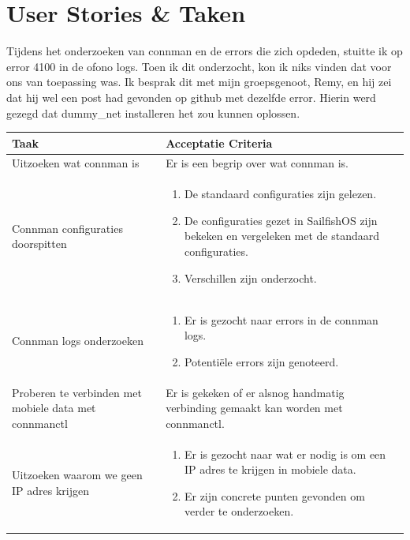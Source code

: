 \documentclass[a4paper]{report}
\newcommand{\learningstorycolor}{PaleGreen1}
\begin{document}
\section{User Stories \& Taken}
\begin{tcolorbox}[colback=white, coltitle=black, colframe=\learningstorycolor, title=\textbf{Learning Story: }Als ontwikkelaar wil ik weten wat de rol van connman is in 4G\, zodat ik kan uitzoeken of het mobiele data probleem ligt bij connman.]
  \par\smallskip 
  Tijdens het onderzoeken van connman en de errors die zich opdeden, stuitte ik op error 4100 in de ofono logs.
  Toen ik dit onderzocht, kon ik niks vinden dat voor ons van toepassing was.
  Ik besprak dit met mijn groepsgenoot, Remy, en hij zei dat hij wel een post had gevonden op github met dezelfde error.
  Hierin werd gezegd dat dummy\_net installeren het zou kunnen oplossen.

  \begin{table}[H]
      \centering
    \begin{tabularx}{1\textwidth}{|X|X|}
      \hline
      \cellcolor[HTML]{ffcc99} \textbf{Taak} & \cellcolor[HTML]{ffcc99} \textbf{Acceptatie Criteria} \\ 
      \hline
      Uitzoeken wat connman is & Er is een begrip over wat connman is. \\ 
      \hline 
      Connman configuraties doorspitten & 
      \begin{enumerate}[leftmargin=.4cm, topsep=0cm, itemsep=.2cm]
        \item De standaard configuraties zijn gelezen. 
        \item De configuraties gezet in SailfishOS zijn bekeken en vergeleken met de standaard configuraties.
        \item Verschillen zijn onderzocht.
      \end{enumerate} \\ 
      \hline
      Connman logs onderzoeken & 
      \begin{enumerate}[leftmargin=.4cm, topsep=0cm, itemsep=.2cm]
        \item Er is gezocht naar errors in de connman logs.
        \item Potentiële errors zijn genoteerd. 
      \end{enumerate}\\
      \hline
      Proberen te verbinden met mobiele data met connmanctl & 
      Er is gekeken of er alsnog handmatig verbinding gemaakt kan worden met connmanctl. \\ 
      \hline
      Uitzoeken waarom we geen IP adres krijgen & 
      \begin{enumerate}[leftmargin=.4cm, topsep=0cm, itemsep=.2cm]
        \item Er is gezocht naar wat er nodig is om een IP adres te krijgen in mobiele data.
        \item Er zijn concrete punten gevonden om verder te onderzoeken.
      \end{enumerate} \\


\end{tabularx}
\end{table}
\end{tcolorbox}
\end{document}
